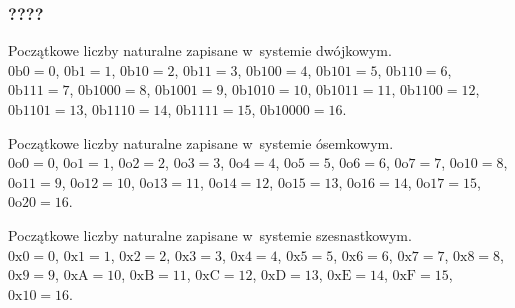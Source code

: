 \documentclass[10pt,t]{beamer}
\begin{document}
\begin{frame}
  \frametitle{????}

  Początkowe liczby naturalne zapisane w~systemie dwójkowym. \\
  $0\text{b}0 = 0$, $0\text{b}1 = 1$, $0\text{b}10 = 2$, $0\text{b}11 = 3$,
  $0\text{b}100 = 4$, $0\text{b}101 = 5$, $0\text{b}110 = 6$,
  $0\text{b}111 = 7$, $0\text{b}1000 = 8$, $0\text{b}1001 = 9$,
  $0\text{b}1010 = 10$, $0\text{b}1011 = 11$, $0\text{b}1100 = 12$,
  $0\text{b}1101 = 13$, $0\text{b}1110 = 14$, $0\text{b}1111 = 15$,
  $0\text{b}10000 = 16$.

  Początkowe liczby naturalne zapisane w~systemie ósemkowym. \\
  $0\text{o}0 = 0$, $0\text{o}1 = 1$, $0\text{o}2 = 2$, $0\text{o}3 = 3$,
  $0\text{o}4 = 4$, $0\text{o}5 = 5$, $0\text{o}6 = 6$, $0\text{o}7 = 7$,
  $0\text{o}10 = 8$, $0\text{o}11 = 9$, $0\text{o}12 = 10$,
  $0\text{o}13 = 11$, $0\text{o}14 = 12$, $0\text{o}15 = 13$,
  $0\text{o}16 = 14$, $0\text{o}17 = 15$, $0\text{o}20 = 16$.

  Początkowe liczby naturalne zapisane w~systemie szesnastkowym. \\
  $0\text{x}0 = 0$, $0\text{x}1 = 1$, $0\text{x}2 = 2$, $0\text{x}3 = 3$,
  $0\text{x}4 = 4$, $0\text{x}5 = 5$, $0\text{x}6 = 6$, $0\text{x}7 = 7$,
  $0\text{x}8 = 8$, $0\text{x}9 = 9$, $0\text{xA} = 10$,
  $0\text{xB} = 11$, $0\text{xC} = 12$, $0\text{xD} = 13$,
  $0\text{xE} = 14$, $0\text{xF} = 15$, $0\text{x}10 = 16$.

\end{frame}


















\end{document}
